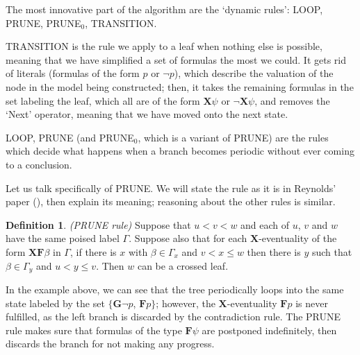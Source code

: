 \documentclass[11pt]{article}
\newcommand{\X}{{\mathbf{X}}}
\newcommand{\F}{{\mathbf{F}}}
\newcommand{\andd}{{\wedge}}
\newcommand{\G}{{\mathbf{G}}}
\theoremstyle{definition}
\newtheorem*{definition}{Definition}
\begin{document}
The most innovative part of the algorithm are the `dynamic rules': LOOP, PRUNE, {PRUNE}$_0$, TRANSITION.

TRANSITION is the rule we apply to a leaf when nothing else is possible, meaning that we have simplified a set of formulas the most we could. It gets 
rid of literals (formulas of the form $p$ or $\neg p$), which describe the valuation of the node in the model being constructed; then,
it takes the remaining formulas in the set labeling the leaf, which all are of the form $\X\psi$ or $\neg\X\psi$, and removes the `Next' operator,
meaning that we have moved onto the next state.

LOOP, PRUNE (and {PRUNE}$_0$, which is a variant of PRUNE) are the rules which decide what happens when a branch becomes periodic without ever 
coming to a conclusion.

Let us talk specifically of PRUNE.
We will state the rule as it is in Reynolds' paper (\cite{ReyLTL}), then explain its meaning; reasoning about the other rules is similar.

\begin{definition}
    \emph{(PRUNE rule)}
    Suppose that $u < v < w$ and each of $u$, $v$ and $w$ have the same poised
    label $\Gamma$. Suppose also that for each $\X$-eventuality of the form $\X\F\beta$ in $\Gamma$, if there is $x$ with
    $\beta \in \Gamma_x$ and $v < x \leq w$ then there is $y$ such that $\beta\in\Gamma_y$ and $u < y \leq v$. Then $w$ can be a
    crossed leaf.
\end{definition}

\begin{center} 
\end{center}

In the example above, we can see that the tree periodically loops into the same state labeled by the set $\{\G\neg p$, $\F p\}$;
however, the $\X$-eventuality $\F p$ is never fulfilled, as the left branch is discarded by the contradiction rule. The PRUNE rule
makes sure that formulas of the type $\F\psi$ are postponed indefinitely, then discards the branch for not making any progress.
\end{document}
